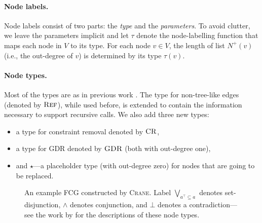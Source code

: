 \paragraph*{Node labels.}
Node labels consist of two parts: the \emph{type} and the \emph{parameters}.
To avoid clutter, we leave the parameters implicit and let $\tau$ denote the
node-labelling function that maps each node in $V$ to its type. For each
node $v \in V$, the length of list $N^+(v)$ (i.e., the out-degree of $v$) is
determined by its type $\tau(v)$.

\paragraph*{Node types.}
Most of the types are as in previous work
\citep{DBLP:conf/nips/Broeck11,DBLP:conf/ijcai/BroeckTMDR11}. The type for
non-tree-like edges (denoted by $\operatorname{\textsc{Ref}}$), while used before, is extended to
contain the information necessary to support recursive calls. We also add three
new types:
\begin{itemize}
  \item a type for constraint removal denoted by $\operatorname{\textsc{CR}}$,
  \item a type for GDR denoted by $\operatorname{\textsc{GDR}}$ (both with out-degree one),
  \item and $\star$---a placeholder type (with out-degree zero) for nodes that
        are going to be replaced.
\end{itemize}

\begin{figure}[t]
  \centering
  \caption{An example FCG constructed by \textsc{Crane}. Label
    $\bigvee_{a^\top \subseteq a}$ denotes set-disjunction, $\land$ denotes
    conjunction, and $\bot$ denotes a contradiction---see the work by
    \citet{DBLP:conf/ijcai/BroeckTMDR11} for the descriptions of these node
    types.}\label{fig:examplefcg}
\end{figure}

